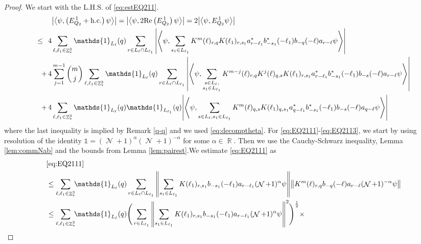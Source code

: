 \documentclass[sn-mathphys, Numbered ,a4paper]{sn-jnl}%
\DeclareMathOperator{\R}{\mathbb{R}}
\DeclareMathOperator{\Z}{\mathbb{Z}}
\DeclareMathOperator{\NN}{\mathcal{N}}
\newcommand{\half}{\frac{1}{2}}
\newcommand{\eva}[1]{\left\langle #1 \right\rangle}
\theoremstyle{plain}
\theoremstyle{definition}
\theoremstyle{remark}
\theoremstyle{plain}
\theoremstyle{definition}
\theoremstyle{remark}
\begin{document}
\begin{proof}
  We start with the L.H.S. of \eqref{eq:estEQ211}.
  \begin{align}
  	&\abs{\eva{\psi,\left(E^{\,1}_{Q_2}+\mathrm{h.c.}\right) \psi }} = \abs{\eva{\psi,2\mathrm{Re}\left(E^{\,1}_{Q_2}\right) \psi }} = 2\abs{\eva{\psi, E^{\,1}_{Q_2} \psi }}\nonumber\\
  	\leq\,\;4& \sum\limits_{\ell, \ell_1\in \Z^3_*} \mathds{1}_{L_{\ell}}(q) \sum\limits_{r\in L_{\ell} \cap L_{\ell_1}} \abs{\eva{\psi, \sum\limits_{s_1\in L_{\ell_1}} K^m(\ell )_{r,q} K(\ell_1)_{r,s_1} a^*_{r-\ell_1}  b^*_{-s_1}(-\ell_1) b_{-q}(-\ell) a_{r-\ell}  \psi }}\label{eq:EQ2111}\\
  	+\,4& \sum\limits_{j=1}^{m-1} {{m}\choose j} \sum\limits_{\ell, \ell_1\in \Z^3_*}\mathds{1}_{L_{\ell}}(q) \sum\limits_{r\in L_{\ell} \cap L_{\ell_1}}  \abs{\eva{\psi, \sum\limits_{\substack{s \in L_{\ell},\\ s_1\in L_{\ell_1}}} K^{m-j}(\ell)_{r,q} K^{j}(\ell)_{q,s} K(\ell_1)_{r,s_1} a^*_{r-\ell_1} b^*_{-s_1}(-\ell_1) b_{-s}(-\ell) a_{r-\ell} \psi }}\label{eq:EQ2112}\\
  	+\,4&\sum\limits_{\ell, \ell_1\in \Z^3_*} \mathds{1}_{L_{\ell}}(q) \mathds{1}_{L_{\ell_1}}(q) \abs{\eva{\psi,  \sum\limits_{s \in L_{\ell}, s_1\in L_{\ell_1}} K^m(\ell)_{q,s}K(\ell_1)_{q,s_1}
  	a^*_{q-\ell_1} b^*_{-s_1}(-\ell_1) b_{-s}(-\ell) a_{q-\ell} \psi}} \label{eq:EQ2113}
  \end{align}
  where the last inequality is implied by Remark \ref{q-q} and we used \eqref{eq:decomptheta}.
  For \eqref{eq:EQ2111}-\eqref{eq:EQ2113}, we start by using resolution of the identity $\mathds{1} = (\NN+1)^{\alpha}(\NN+1)^{-\alpha}$ for some $\alpha \in \R$. Then we use the Cauchy-Schwarz inequality, Lemma \ref{lem:commNab} and the bounds from Lemma \ref{lem:pairest}.We estimate \eqref{eq:EQ2111} as
\begin{align}
	&\eqref{eq:EQ2111}\nonumber\\
	&\leq\sum\limits_{\ell,\ell_1 \in \Z^3_*} \!\!\mathds{1}_{L_\ell}(q) \sum\limits_{ r \in L_\ell \cap L_{\ell_1}}    \norm{ \sum\limits_{s_1 \in L_{\ell_1}} K(\ell_1)_{r,s_1} b_{-s_1}(-\ell_1)  a_{r-\ell_1} (\NN+1)^{\alpha}\psi}\norm{ K^{m}(\ell)_{r,q}   b_{-q}(-\ell) a_{r-\ell} (\NN+1)^{-\alpha}\psi } \nonumber\\
 	&\leq \sum\limits_{\ell,\ell_1 \in \Z^3_*} \!\!\mathds{1}_{L_\ell}(q) \Bigg( \sum\limits_{r \in L_{\ell_1}} \norm{\sum\limits_{s_1 \in L_{\ell_1}} K(\ell_1)_{r,s_1} b_{-s_1}(-\ell_1) a_{r-\ell_1} (\NN+1)^{\alpha}\psi}^2\Bigg)^\half \times\nonumber\\

\end{align}
\end{proof}
\end{document}
